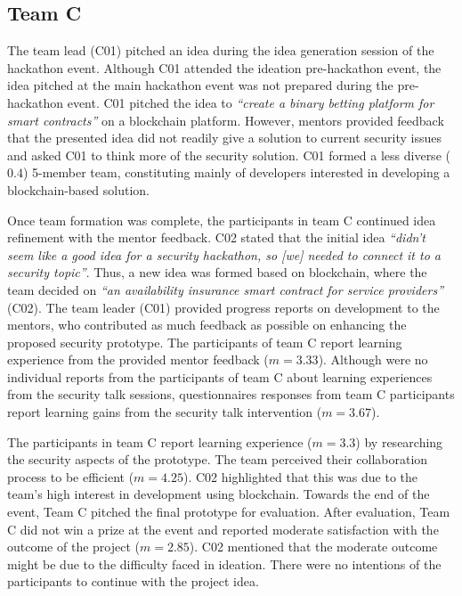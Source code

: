 \documentclass[runningheads]{llncs}
\begin{document}
\subsection{Team C}
The team lead (C01) pitched an idea during the idea generation session of the hackathon event. Although C01 attended the ideation pre-hackathon event, the idea pitched at the main hackathon event was not prepared during the pre-hackathon event. C01 pitched the idea to \textit{``create a binary betting platform for smart contracts''} on a blockchain platform. However, mentors provided feedback that the presented idea did not readily give a solution to current security issues and asked C01 to think more of the security solution. C01 formed a less diverse ($\textit{0.4}$) 5-member team, constituting mainly of developers interested in developing a blockchain-based solution.

Once team formation was complete, the participants in team C continued idea refinement with the mentor feedback. C02 stated that the initial idea \textit{``didn't seem like a good idea for a security hackathon, so [we] needed to connect it to a security topic''}. Thus, a new idea was formed based on blockchain, where the team decided on \textit{``an availability insurance smart contract for service providers''} (C02). The team leader (C01) provided progress reports on development to the mentors, who contributed as much feedback as possible on enhancing the proposed security prototype. The participants of team C report learning experience from the provided mentor feedback ($m = 3.33$). Although were no individual reports from the participants of team C about learning experiences from the security talk sessions, questionnaires responses from team C participants report learning gains from the security talk intervention ($m = 3.67$).

The participants in team C report learning experience ($m = 3.3$) by researching the security aspects of the prototype. The team perceived their collaboration process to be efficient ($m = 4.25$). C02 highlighted that this was due to the team's high interest in development using blockchain. Towards the end of the event, Team C pitched the final prototype for evaluation. After evaluation, Team C did not win a prize at the event and reported moderate satisfaction with the outcome of the project ($m = 2.85$). C02 mentioned that the moderate outcome might be due to the difficulty faced in ideation. There were no intentions of the participants to continue with the project idea.
\end{document}
